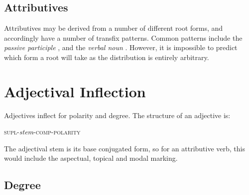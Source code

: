 \documentclass[grammar]{subfiles}
\begin{document}
  \subsection{Attributives}
  \label{ssec:am_attributives}

  Attributives may be derived from a number of different root forms, and accordingly have a number of transfix patterns. 
  Common patterns include the \emph{passive participle} , and the \emph{verbal noun} . 
  However, it is impossible to predict which form a root will take as the distribution is entirely arbitrary.

%
%


  \section{Adjectival Inflection}
  \label{sec:am_adjectival_inflection}

  Adjectives inflect for polarity and degree.  The structure of an adjective is:

  \begin{exe}
    \ex\label{ex:am_adjective_structure} \textsc{supl-}\textit{stem}\textsc{-comp-polarity}
  \end{exe}	

  The adjectival stem is its base conjugated form, so for an attributive verb, this would include the aspectual, topical and modal marking. 

  \subsection{Degree}
  \label{ssec:am_degree}
\end{document}
